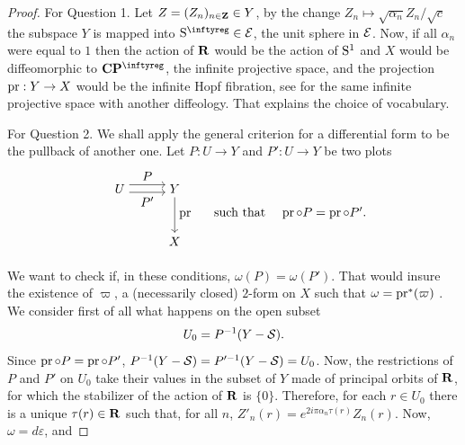 \begin{proof}
  For Question 1. Let $Z = (Z_n)_{n\in \mathbf{Z}} \in Y$, by the change $ Z_n \mapsto \sqrt{\alpha_n} Z_n/\sqrt{c}$ the subspace
  $Y$ is mapped into $\Sph^\infty \in \cE$, the unit sphere in $\mathcal{E}$. Now, if all $\alpha_n$ were equal to $1$
  then the action of $\mathbf{R}$ would be the action of $\mathrm{S}^1$ and
  $X$ would be diffeomorphic to $\CC\PP^\infty$, the infinite projective space,
  and the projection $\operatorname{pr} : Y \to X$ would be the infinite Hopf fibration, see \cite[\textsection\,4.11]{PIZ13}
  for the same infinite projective space with another diffeology. That
  explains the choice of vocabulary.
  
  For Question 2. We shall apply the general criterion for a differential form to be the pullback of another one.
  Let $P : U \to Y$ and $P ' : U \to Y$ be two plots
  $$
    \begin{array}{ccc}
    \begin{array}{c}
    \begin{tikzpicture}
    \matrix[matrix of math nodes, row sep=1cm, column sep=1cm]
    {
    |(A)|  U & |(B)| Y  \\
    |(C)|     & |(D)| X \\
    };
    \begin{scope}[every node/.style={pos=0.5,font=\normalsize}]
    \draw[->] ([yshift = 3pt] A.east) -- ([yshift = 3pt] B.west) node[midway,above] {\mbox{$P$}};
    \draw[->] ([yshift = -3pt] A.east) -- ([yshift = -3pt] B.west) node[midway,below] {\mbox{$P '$}};
    \draw[->] (B) -- (D) node[auto=left] {\mbox{$\Proj$}} ;
    \end{scope}
    \end{tikzpicture}
    \end{array}
    & \mbox{such that } & \Proj \circ P = \Proj \circ P '.
    \end{array}
    $$
  We want to check if, in these conditions, $\omega(P) = \omega(P ')$. That would insure the existence of
  $\varpi$, a (necessarily closed) $2$-form on $X$ such that $\omega = \operatorname{pr}^*(\varpi)$ \cite[\textsection\,6.38]{PIZ13}.
  We consider first of all what happens on the open subset
  $$
    U_0 = P^{-1}(Y - \mathcal{S}).
    $$
  Since $\operatorname{pr} \circ P = \operatorname{pr} \circ P '$,
  $P^{-1}(Y - \mathcal{S}) = P '^{-1}(Y - \mathcal{S}) = U_0$.
  Now, the restrictions of $P$ and $P '$ on $U_0$ take their values in the subset of $Y$
  made of principal orbits of $\mathbf{R}$,
  for which the stabilizer of the action of $\mathbf{R}$ is $\{0\}$. Therefore, for each $r \in U_0$ there is a unique $\tau(r) \in \mathbf{R}$
  such that, for all $n$, $Z'_n(r) = e^{2i\pi \alpha_n \tau(r)} Z_n(r)$. Now, $\omega = d\varepsilon$, and

\end{proof}
